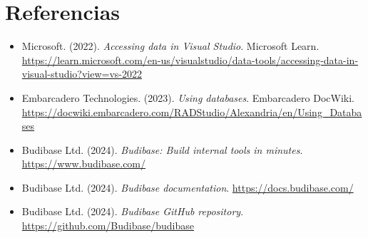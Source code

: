 \documentclass[12pt, a4paper]{article}
\begin{document}
\section{Referencias}
\begin{itemize}
    \item Microsoft. (2022). \textit{Accessing data in Visual Studio}. Microsoft Learn. \url{https://learn.microsoft.com/en-us/visualstudio/data-tools/accessing-data-in-visual-studio?view=vs-2022}

    \item Embarcadero Technologies. (2023). \textit{Using databases}. Embarcadero DocWiki. \url{https://docwiki.embarcadero.com/RADStudio/Alexandria/en/Using_Databases}

    \item Budibase Ltd. (2024). \textit{Budibase: Build internal tools in minutes}. \url{https://www.budibase.com/}

    \item Budibase Ltd. (2024). \textit{Budibase documentation}. \url{https://docs.budibase.com/}

    \item Budibase Ltd. (2024). \textit{Budibase GitHub repository}. \url{https://github.com/Budibase/budibase}
\end{itemize}
\end{document}
